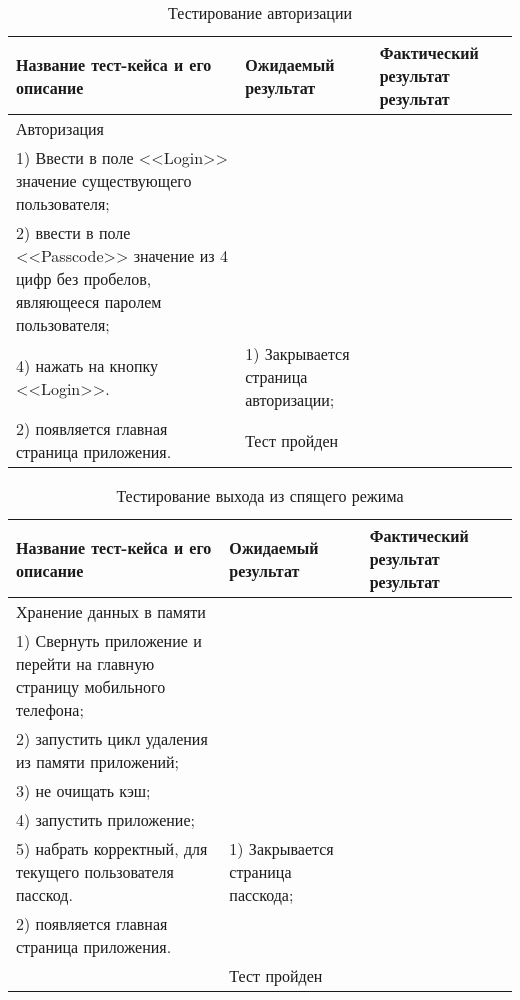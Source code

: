 \begin{longtable}[l]{| >{\raggedright}p{}
                     | >{\raggedright}p{}
                     | >{\raggedright\arraybackslash}p{}|}
  \caption{Тестирование авторизации}
  \label{sec:testing:configuration_login} \tabularnewline

  \hline
       Название тест-кейса и его описание & Ожидаемый результат & Фактический результат результат \\
   \hline
   Авторизация\\ 
   1) Ввести в поле <<Login>> значение существующего пользователя; \\
   2) ввести в поле <<Passcode>> значение из 4 цифр без пробелов, являющееся паролем пользователя; \\  
   4) нажать на кнопку <<Login>>.

   &
   1) Закрывается страница авторизации; \\
   2) появляется главная страница приложения.

   & Тест пройден \\
   \hline
\end{longtable}



\begin{longtable}[l]{| >{\raggedright}p{}                     
                     | >{\raggedright}p{}
                     | >{\raggedright\arraybackslash}p{}|}
  \caption{Тестирование выхода из спящего режима}
  \label{sec:testing:data_storing} \tabularnewline

  \hline
      Название тест-кейса и его описание & Ожидаемый результат & Фактический результат результат \\
   \hline
   Хранение данных в памяти\\ 
   1) Свернуть приложение и перейти на главную страницу мобильного телефона; \\
   2) запустить цикл удаления из памяти приложений;\\
   3) не очищать кэш;\\
   4) запустить приложение;\\
   5) набрать корректный, для текущего пользователя пасскод.

   &
   1) Закрывается страница пасскода;\\
   2) появляется главная страница приложения.\\

   &
   Тест пройден \\
   \hline
\end{longtable}

